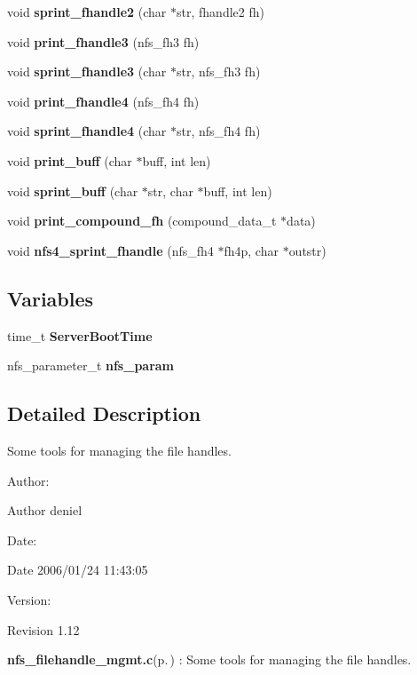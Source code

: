 \begin{CompactItemize}
void {\bf sprint\_\-fhandle2} (char $\ast$str, fhandle2 fh)
\item 
void {\bf print\_\-fhandle3} (nfs\_\-fh3 fh)
\item 
void {\bf sprint\_\-fhandle3} (char $\ast$str, nfs\_\-fh3 fh)
\item 
void {\bf print\_\-fhandle4} (nfs\_\-fh4 fh)
\item 
void {\bf sprint\_\-fhandle4} (char $\ast$str, nfs\_\-fh4 fh)
\item 
void {\bf print\_\-buff} (char $\ast$buff, int len)
\item 
void {\bf sprint\_\-buff} (char $\ast$str, char $\ast$buff, int len)
\item 
void {\bf print\_\-compound\_\-fh} (compound\_\-data\_\-t $\ast$data)
\item 
void {\bf nfs4\_\-sprint\_\-fhandle} (nfs\_\-fh4 $\ast$fh4p, char $\ast$outstr)
\end{CompactItemize}
\subsection*{Variables}
\begin{CompactItemize}
\item 
time\_\-t {\bf Server\-Boot\-Time}
\item 
nfs\_\-parameter\_\-t {\bf nfs\_\-param}
\end{CompactItemize}


\subsection{Detailed Description}
Some tools for managing the file handles. 

\begin{Desc}
\item[Author:]\begin{Desc}
\item[Author]deniel \end{Desc}
\end{Desc}
\begin{Desc}
\item[Date:]\begin{Desc}
\item[Date]2006/01/24 11:43:05 \end{Desc}
\end{Desc}
\begin{Desc}
\item[Version:]\begin{Desc}
\item[Revision]1.12 \end{Desc}
\end{Desc}
{\bf nfs\_\-filehandle\_\-mgmt.c}{\rm (p.\,\pageref{nfs__filehandle__mgmt_8c})} : Some tools for managing the file handles.

